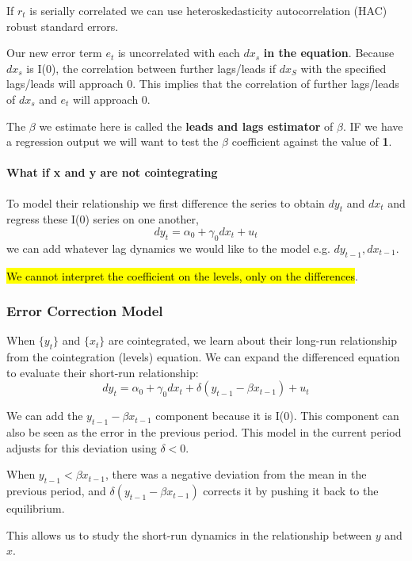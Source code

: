 \documentclass[11pt]{article}
\begin{document}
If $r_t$ is serially correlated we can use heteroskedasticity autocorrelation (HAC) robust standard errors.

 Our new error term $e_t$ is uncorrelated with each $dx_s$ \textbf{in the equation}. Because $dx_s$ is I(0), the correlation between further lags/leads if $dx_S$ with the specified lags/leads will approach 0. This implies that the correlation of further lags/leads of $dx_s$ and $e_t$ will approach 0.

 The $\beta$ we estimate here is called the \textbf{leads and lags estimator} of $\beta$. IF we have a regression output we will want to test the $\beta$ coefficient against the value of \textbf{1}.

 \paragraph{What if x and y are not cointegrating} \mbox{}

 To model their relationship we first difference the series to obtain $dy_t$ and $dx_t$ and regress these I(0) series on one another,
 \[dy_t = \alpha_0 + \gamma_0 dx_t + u_t\]
 we can add whatever lag dynamics we would like to the model e.g. $dy_{t-1}, dx_{t-1}$.

 \hl{We cannot interpret the coefficient on the levels, only on the differences}.

 \subsubsection{Error Correction Model}

 When $\{y_t\}$ and $\{x_t\}$ are cointegrated, we learn about their long-run relationship from the cointegration (levels) equation. We can expand the differenced equation to evaluate their short-run relationship:
 \begin{equation}
d y_t=\alpha_0+\gamma_0 d x_t+\delta\left(y_{t-1}-\beta x_{t-1}\right)+u_t
\end{equation}

We can add the $y_{t-1}-\beta x_{t-1}$ component because it is I(0). This component can also be seen as the error in the previous period. This model in the current period adjusts for this deviation using $\delta<0$.

When $y_{t-1}<\beta x_{t-1}$, there was a negative deviation from the mean in the previous period, and $\delta(y_{t-1}-\beta x_{t-1})$ corrects it by pushing it back to the equilibrium.

This allows us to study the short-run dynamics in the relationship between $y$ and $x$.
\end{document}
